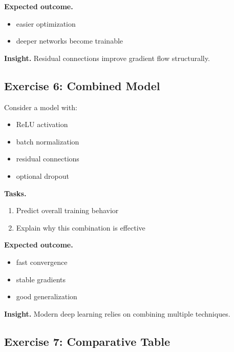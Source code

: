 \medskip

\noindent
\textbf{Expected outcome.}

\begin{itemize}
    \item easier optimization
    \item deeper networks become trainable
\end{itemize}

\medskip

\noindent
\textbf{Insight.}  
Residual connections improve gradient flow structurally.

\subsection{Exercise 6: Combined Model}

Consider a model with:

\begin{itemize}
    \item ReLU activation
    \item batch normalization
    \item residual connections
    \item optional dropout
\end{itemize}

\medskip

\noindent
\textbf{Tasks.}
\begin{enumerate}
    \item Predict overall training behavior
    \item Explain why this combination is effective
\end{enumerate}

\medskip

\noindent
\textbf{Expected outcome.}

\begin{itemize}
    \item fast convergence
    \item stable gradients
    \item good generalization
\end{itemize}

\medskip

\noindent
\textbf{Insight.}  
Modern deep learning relies on combining multiple techniques.

\subsection{Exercise 7: Comparative Table}

